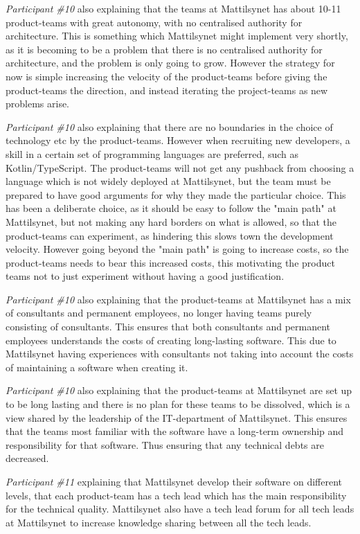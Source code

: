 \textit{Participant \#10} also explaining that the teams at Mattilsynet has about 10-11 product-teams with great autonomy, with no centralised authority for architecture. This is something which Mattilsynet might implement very shortly, as it is becoming to be a problem that there is no centralised authority for architecture, and the problem is only going to grow. However the strategy for now is simple increasing the velocity of the product-teams before giving the product-teams the direction, and instead iterating the project-teams as new problems arise.

\textit{Participant \#10} also explaining that there are no boundaries in the choice of technology etc by the product-teams. However when recruiting new developers, a skill in a certain set of programming languages are preferred, such as Kotlin/TypeScript. The product-teams will not get any pushback from choosing a language which is not widely deployed at Mattilsynet, but the team must be prepared to have good arguments for why they made the particular choice. This has been a deliberate choice, as it should be easy to follow the "main path" at Mattilsynet, but not making any hard borders on what is allowed, so that the product-teams can experiment, as hindering this slows town the development velocity. However going beyond the "main path" is going to increase costs, so the product-teams needs to bear this increased costs, this motivating the product teams not to just experiment without having a good justification.

\textit{Participant \#10} also explaining that the product-teams at Mattilsynet has a mix of consultants and permanent employees, no longer having teams purely consisting of consultants. This ensures that both consultants and permanent employees understands the costs of creating long-lasting software. This due to Mattilsynet having experiences with consultants not taking into account the costs of maintaining a software when creating it.

\textit{Participant \#10} also explaining that the product-teams at Mattilsynet are set up to be long lasting and there is no plan for these teams to be dissolved, which is a view shared by the leadership of the IT-department of Mattilsynet. This ensures that the teams most familiar with the software have a long-term ownership and responsibility for that software. Thus ensuring that any technical debts are decreased.

\textit{Participant \#11} explaining that Mattilsynet develop their software on different levels, that each product-team has a tech lead which has the main responsibility for the technical quality. Mattilsynet also have a tech lead forum for all tech leads at Mattilsynet to increase knowledge sharing between all the tech leads.

